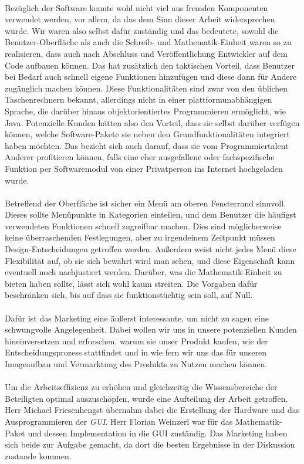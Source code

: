\ \\
Bezüglich der Software konnte wohl nicht viel aus fremden Komponenten verwendet werden, vor allem, da das dem Sinn dieser Arbeit widersprechen würde. Wir waren also selbst dafür zuständig und das bedeutete, sowohl die Benutzer-Oberfläche als auch die Schreib- und Mathematik-Einheit waren so zu realisieren, dass auch nach Abschluss und Veröffentlichung Entwickler auf dem Code aufbauen können. Das hat zusätzlich den taktischen Vorteil, dass Benutzer bei Bedarf auch schnell eigene Funktionen hinzufügen und diese dann für Andere zugänglich machen können. Diese Funktionalitäten sind zwar von den üblichen Taschenrechnern bekannt, allerdings nicht in einer plattformunabhängigen Sprache, die darüber hinaus objektorientiertes Programmieren ermöglicht, wie Java.
Potenzielle Kunden hätten also den Vorteil, dass sie selbst darüber verfügen können, welche Software-Pakete sie neben den Grundfunktionalitäten integriert haben möchten. Das bezieht sich auch darauf, dass sie vom Programmiertalent Anderer profitieren können, falls eine eher ausgefallene oder fachspezifische Funktion per Softwaremodul von einer Privatperson ins Internet hochgeladen wurde.\\
\\
Betreffend der Oberfläche ist sicher ein Menü am oberen Fensterrand sinnvoll. Dieses sollte Menüpunkte in Kategorien einteilen, und dem Benutzer die häufigst verwendeten Funktionen schnell zugreifbar machen. Dies sind möglicherweise keine überraschenden Festlegungen, aber zu irgendeinem Zeitpunkt müssen Design-Entscheidungen getroffen werden. Außerdem weist nicht jedes Menü diese Flexibilität auf, ob sie sich bewährt wird man sehen, und diese Eigenschaft kann eventuell noch nachjustiert werden.
Darüber, was die Mathematik-Einheit zu bieten haben sollte, lässt sich wohl kaum streiten. Die Vorgaben dafür beschränken sich, bis auf dass sie funktionstüchtig sein soll, auf Null.\\
\\
Dafür ist das Marketing eine äußerst interessante, um nicht zu sagen eine schwungvolle Angelegenheit. Dabei wollen wir uns in unsere potenziellen Kunden hineinversetzen und erforschen, warum sie unser Produkt kaufen, wie der Entscheidungsprozess stattfindet und in wie fern wir uns das für unseren Imageaufbau und Vermarktung des Produkts zu Nutzen machen können.\\
\\
Um die Arbeitseffizienz zu erhöhen und gleichzeitig die Wissensbereiche der Beteiligten optimal auszuschöpfen, wurde eine Aufteilung der Arbeit getroffen. Herr Michael Friesenhengst übernahm dabei die Erstellung der Hardware und das Ausprogrammieren der \textit{GUI}. Herr Florian Weinzerl war für das Mathematik-Paket und dessen Implementation in die GUI zuständig. Das Marketing haben sich beide zur Aufgabe gemacht, da dort die besten Ergebnisse in der Diskussion zustande kommen.